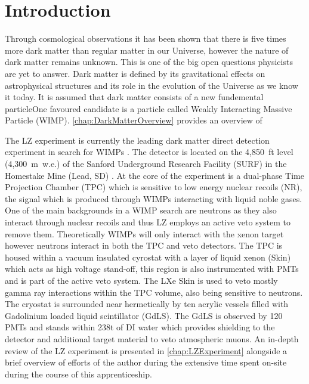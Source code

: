 \chapter{Introduction}
Through cosmological observations it has been shown that there is five times more dark matter than regular matter in our Universe, however the nature of dark matter remains unknown. This is one of the big open questions physicists are yet to answer. Dark matter is defined by its gravitational effects on astrophysical structures and its role in the evolution of the Universe as we know it today. It is assumed that dark matter consists of a new fundemental particleOne favoured candidate is a particle called Weakly Interacting Massive Particle (WIMP). \autoref{chap:DarkMatterOverview} provides an overview of 

The LZ experiment is currently the leading dark matter direct detection experiment in search for WIMPs \cite{LZCollaboration:2024lux}. The detector is located on the 4,850~ft level (4,300~m~w.e.) of the Sanford Underground Research Facility (SURF) in the Homestake Mine (Lead, SD) \cite{LZNIMA}. At the core of the experiment is a dual-phase Time Projection Chamber (TPC) which is sensitive to low energy nuclear recoils (NR), the signal which is produced through WIMPs interacting with liquid noble gases. One of the main backgrounds in a WIMP search are neutrons as they also interact through nuclear recoils and thus LZ employs an active veto system to remove them. Theoretically WIMPs will only interact with the xenon target however neutrons interact in both the TPC and veto detectors. The TPC is housed within a vacuum insulated cyrostat with a layer of liquid xenon (Skin) which acts as high voltage stand-off, this region is also instrumented with PMTs and is part of the active veto system. The LXe Skin is used to veto mostly gamma ray interactions within the TPC volume, also being sensitive to neutrons. The cryostat is surrounded near hermetically by ten acrylic vessels filled with  Gadolinium loaded liquid scintillator (GdLS). The GdLS is observed by 120 PMTs and stands within 238t of DI water which provides shielding to the detector and additional target material to veto atmospheric muons. An in-depth review of the LZ experiment is presented in \autoref{chap:LZExperiment} alongside a brief overview of efforts of the author during the extensive time spent on-site during the course of this apprenticeship. 

